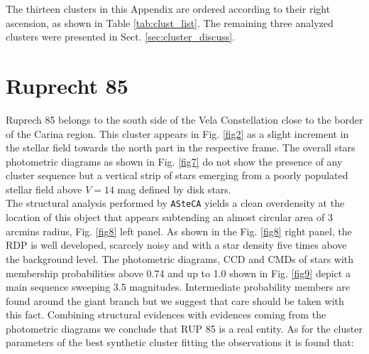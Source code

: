 \documentclass[draft]{aa}
\begin{document}




















































\appendix

The thirteen clusters in this Appendix are ordered according to their right
ascension, as shown in Table \ref{tab:clust_list}. The remaining three analyzed
clusters were presented in Sect. \ref{sec:cluster_discuss}.

\section{Ruprecht 85}

Ruprech 85 belongs to the south side of the Vela Constellation close to the
border of the Carina region. This cluster appears in Fig. \ref{fig2} as a slight
increment in the stellar field towards the north part in the respective frame.
The overall stars photometric diagrams as shown in Fig. \ref{fig7} do not show
the presence of any cluster sequence but a vertical strip of stars emerging from
a poorly populated stellar field above $V= 14$ mag defined by disk stars.\\

The structural analysis performed by \texttt{ASteCA} yields a clean overdensity
at the location of this object that appears subtending an almost circular area
of 3 arcmins radius, Fig. \ref{fig8} left panel. As shown in the Fig. \ref{fig8}
right panel, the RDP is well developed, scarcely noisy and with a star density
five times above the background level. The photometric diagrams, CCD and CMDs of
stars with membership probabilities above 0.74 and up to 1.0 shown in Fig.
\ref{fig9} depict a main sequence sweeping 3.5 magnitudes. Intermediate
probability members are found around the giant branch but we suggest that
care should be taken with this fact. Combining structural evidences with
evidences coming from the photometric diagrams we conclude that RUP 85 is a
real entity. As for the cluster parameters of the best synthetic cluster
fitting the observations it is found that:
\end{document}
